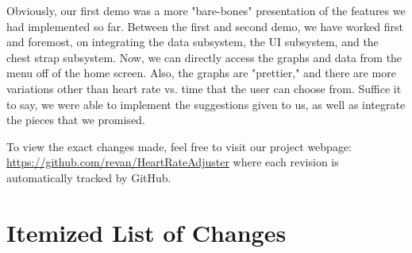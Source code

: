 \documentclass[letterpaper,english, 12pt]{scrreprt}
\begin{document}
Obviously, our first demo was a more "bare-bones" presentation of the features we had implemented so far. Between the first and second demo, we have worked first and foremost, on integrating the data subsystem, the UI subsystem, and the chest strap subsystem. Now, we can directly access the graphs and data from the menu off of the home screen. Also, the graphs are "prettier," and there are more variations other than heart rate vs. time that the user can choose from. Suffice it to say, we were able to implement the suggestions given to us, as well as integrate the pieces that we promised.

To view the exact changes made, feel free to visit our project webpage: \url{ https://github.com/revan/HeartRateAdjuster} where each revision is automatically tracked by GitHub.


 \section*{Itemized List of Changes}
\end{document}
